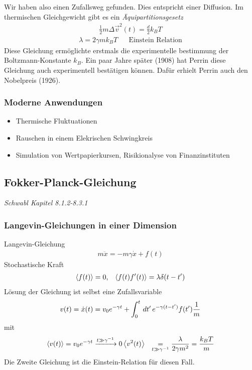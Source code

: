 \begin{description}
Wir haben also einen Zufallsweg gefunden. Dies entspricht einer Diffusion. Im
thermischen Gleichgewicht gibt es ein \emph{Äquipartitionsgesetz}
%
\begin{align*}
  \frac{1}{2} m \Delta \vec{v}^2(t) = \frac{d}{2} k_B T
\end{align*}
%
%
\begin{align*}
  \lambda = 2 \gamma m k_B T && \text{Einstein Relation}
\end{align*}
%
Diese Gleichung ermöglichte erstmals die experimentelle bestimmung
der Boltzmann-Konstante $k_B$.  Ein paar Jahre später (1908) hat Perrin diese Gleichung
auch experimentell bestätigen können. Dafür erhielt Perrin auch den
Nobelpreis (1926).

\subsubsection*{Moderne Anwendungen}
\begin{itemize}
  \item Thermische Fluktuationen
  \item Rauschen in einem Elekrischen Schwingkreis
  \item Simulation von Wertpapierkursen, Risikionalyse von Finanzinstituten
\end{itemize}











\end{description}




\subsection*{Fokker-Planck-Gleichung}
\emph{Schwabl Kapitel 8.1.2-8.3.1}
\subsubsection*{Langevin-Gleichungen in einer Dimension}
%
Langevin-Gleichung
\begin{align*}
  m \ddot{x} = - m \gamma \dot{x} + f(t)
\end{align*}
%
Stochastische Kraft
%
\begin{align*}
  \Braket{f(t)} = 0 , && \Braket{f(t) f'(t)} = \lambda \delta(t - t')
\end{align*}
%
Lösung der Gleichung ist selbst eine Zufallsvariable
%
\begin{align*}
  v(t) = \dot{x}(t) = v_0 e^{-\gamma t} + \int_{0}^{t} \,dt'\,
  e^{-\gamma(t-t') } f(t') \frac{1}{m}
\end{align*}
%
mit
%
\begin{align*}
  \Braket{v(t)} & = v_0 e^{-\gamma t} \xrightarrow{t \gg \gamma^{-1}} 0
  \Braket{v^2(t)} & \underset{t \gg \gamma^{-1}}{=} \frac{\lambda}{2 \gamma m^2} = \frac{k_B T}{m}
\end{align*}
%
Die Zweite Gleichung ist die Einstein-Relation für diesen Fall.


